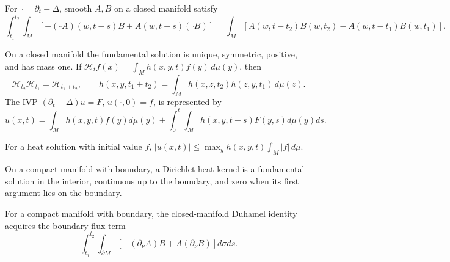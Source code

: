 \begin{lemma}
\label{lem:chow-ii-duhamel-closed}
For $\square=\partial_t-\Delta$, smooth $A,B$ on a closed manifold satisfy
\[
\int_{t_1}^{t_2}\!\int_M[-(\square A)(w,t-s)B+A(w,t-s)(\square B)]
=\int_M[A(w,t-t_2)B(w,t_2)-A(w,t-t_1)B(w,t_1)].
\]
\end{lemma}

\begin{theorem}
\label{thm:chow-ii-closed-heat-kernel}
On a closed manifold the fundamental solution is unique, symmetric, positive,
and has mass one.  If $\mathscr H_t f(x)=\int_M h(x,y,t)f(y)\,d\mu(y)$, then
\[
\mathscr H_{t_2}\mathscr H_{t_1}=\mathscr H_{t_1+t_2},\qquad
h(x,y,t_1+t_2)=\int_M h(x,z,t_2)h(z,y,t_1)\,d\mu(z).
\]
The IVP $(\partial_t-\Delta)u=F$, $u(\cdot,0)=f$, is represented by
\[
u(x,t)=\int_Mh(x,y,t)f(y)d\mu(y)+\int_0^t\!\int_Mh(x,y,t-s)F(y,s)d\mu(y)ds.
\]
\end{theorem}

\begin{corollary}
\label{cor:chow-ii-heat-kernel-sup-bound}
For a heat solution with initial value $f$,
$|u(x,t)|\le\max_yh(x,y,t)\int_M|f|\,d\mu$.
\end{corollary}

\begin{definition}
\label{def:chow-ii-dirichlet-heat-kernel}
On a compact manifold with boundary, a Dirichlet heat kernel is a fundamental
solution in the interior, continuous up to the boundary, and zero when its
first argument lies on the boundary.
\end{definition}

\begin{lemma}
\label{lem:chow-ii-duhamel-boundary}
For a compact manifold with boundary, the closed-manifold Duhamel identity
acquires the boundary flux term
\[
\int_{t_1}^{t_2}\!\int_{\partial M}\left[-(\partial_\nu A)B+A(\partial_\nu B)\right]d\sigma ds.
\]
\end{lemma}

